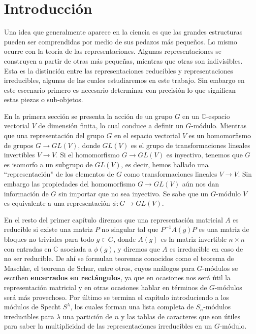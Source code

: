\documentclass[12pt]{book}
\theoremstyle{definition}
\newcounter{in}
\newcounter{ini}
\begin{document}
 \newpage \thispagestyle{empty}
 
 \chapter*{Introducción}

 Una idea que generalmente aparece en la ciencia es que las grandes
 estructuras pueden ser comprendidas por medio de sus pedazos más
 pequeños. Lo mismo ocurre con la teoría de las
 representaciones. Algunas representaciones se construyen a partir de
 otras más pequeñas, mientras que otras son indivisibles. Esta es la
 distinción entre las representaciones reducibles y representaciones
 irreducibles, algunas de las cuales estudiaremos en este
 trabajo. Sin embargo en este escenario primero es necesario
 determinar con precisión lo que significan estas piezas o
 sub-objetos.

 En la primera sección se presenta la acción de un grupo $G$ en un
 $\mathbb{C}$-espacio vectorial $V$ de dimensión finita, lo cual conduce a definir un
 $G$-módulo. Mientras que una representación del grupo $G$ en el
 espacio vectorial $V$ es un homomorfismo de grupos $G \to GL(V)$,
 donde $GL(V)$ es el grupo de transformaciones lineales invertibles
 $V \to V$. Si el homomorfismo $G \to GL(V)$ es inyectivo, tenemos que
 $G$ es isomorfo a un subgrupo de $GL(V)$, es decir, hemos hallado una
 ``representación'' de los elementos de $G$ como transformaciones
 lineales $V \to V$. Sin embargo las propiedades del homomorfismo
 $G \to GL(V)$ aún nos dan información de $G$ sin importar que no sea
 inyectivo. Se sabe que un $G$-módulo $V$ es equivalente a una
 representación $\phi \colon G \to GL(V)$.

 En el resto del primer capítulo diremos que una representación
 matricial $A$ es reducible si existe una matriz $P$ no singular tal
 que $P^{-1}A(g)P$ es una matriz de bloques no triviales para todo $g \in G$, donde $A(g)$ es la matriz invertible $n \times n$ con entradas en $\mathbb{C}$ asociada a $\phi(g)$, y diremos que $A$ es irreducible en caso de no ser reducible. De ahí se formulan teoremas
 conocidos como el teorema de Maschke, el teorema de Schur, entre otros, cuyos análogos para
 $G$-módulos se escriben \textbf{encerrados en rec\-tán\-gu\-los}, ya que en
 ocasiones nos será útil la representación matricial y en otras
 ocasiones hablar en términos de $G$-módulos será más provechoso. Por
 último se termina el capítulo introduciendo a los módulos de Specht $S^{\lambda}$, los cuales forman una lista completa de $S_n$-módulos
 irreducibles para $\lambda$ una partición de $n$ y las tablas de
 caracteres que son útiles para saber la multiplicidad de
 las representaciones irreducibles en un $G$-módulo.
\end{document}
